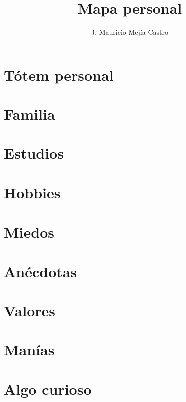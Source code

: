 \documentclass[11pt,letterpaper]{article}
\author{J. Mauricio Mejía Castro}
\title{Mapa personal}
\begin{document}
\maketitle

\section{Tótem personal}
\section{Familia}
\section{Estudios}
\section{Hobbies}
\section{Miedos}
\section{Anécdotas}
\section{Valores}
\section{Manías}
\section{Algo curioso}
\end{document}
